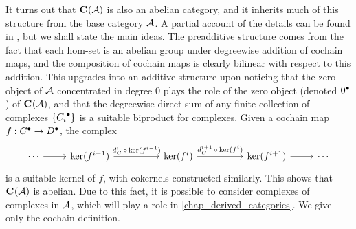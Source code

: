 It turns out that ${\mathbf{C}}^{{}}({\mathcal{A}})$ is also an abelian category, and
it inherits much of this structure from the base category $\mathcal{A}$.
A partial account of the details can be found in
\cite[Section~1.2]{weibel}, but we shall state the main ideas.
The preadditive structure comes from the fact that each hom-set is an
abelian group under degreewise addition of cochain maps, and the
composition of cochain maps is clearly bilinear with respect to this addition.
This upgrades into an additive structure upon noticing that the zero
object of $\mathcal{A}$ concentrated in degree 0 plays the role of the
zero object (denoted ${{0}}^{\bullet}$) of ${\mathbf{C}}^{{}}({\mathcal{A}})$, and that
the degreewise direct sum of any finite collection of complexes
$\{{{C_i}}^{\bullet}\}$ is a suitable biproduct for complexes.
Given a cochain map $f: {{C}}^{\bullet} \to {{D}}^{\bullet}$, the complex
\[
  \begin{tikzcd}
    \cdots & {\ker(f^{i - 1})} && {\ker(f^i)} && {\ker(f^{i + 1})} & \cdots
    \arrow[from=1-1, to=1-2]
    \arrow["{d_C^i \, \circ \, \ker(f^{i - 1})}", from=1-2, to=1-4]
    \arrow["{d_C^{i + 1} \, \circ \, \ker(f^i)}", from=1-4, to=1-6]
    \arrow[from=1-6, to=1-7]
  \end{tikzcd}
\]
is a suitable kernel of $f$, with cokernels constructed similarly.
This shows that ${\mathbf{C}}^{{}}({\mathcal{A}})$ is abelian.
Due to this fact, it is possible to consider complexes of complexes
in $\mathcal{A}$, which will play a role in \cref{chap_derived_categories}.
We give only the cochain definition.

